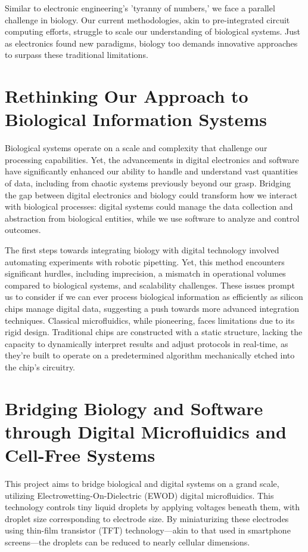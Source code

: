 \documentclass[conference]{IEEEtran}
\begin{document}
Similar to electronic engineering's 'tyranny of numbers,' we face a parallel challenge in biology. Our current methodologies, akin to pre-integrated circuit computing efforts, struggle to scale our understanding of biological systems. Just as electronics found new paradigms, biology too demands innovative approaches to surpass these traditional limitations.

\section{Rethinking Our Approach to Biological Information Systems}

Biological systems operate on a scale and complexity that challenge our processing capabilities. Yet, the advancements in digital electronics and software have significantly enhanced our ability to handle and understand vast quantities of data, including from chaotic systems previously beyond our grasp. Bridging the gap between digital electronics and biology could transform how we interact with biological processes: digital systems could manage the data collection and abstraction from biological entities, while we use software to analyze and control outcomes.

The first steps towards integrating biology with digital technology involved automating experiments with robotic pipetting. Yet, this method encounters significant hurdles, including imprecision, a mismatch in operational volumes compared to biological systems, and scalability challenges. These issues prompt us to consider if we can ever process biological information as efficiently as silicon chips manage digital data, suggesting a push towards more advanced integration techniques. Classical microfluidics, while pioneering, faces limitations due to its rigid design. Traditional chips are constructed with a static structure, lacking the capacity to dynamically interpret results and adjust protocols in real-time, as they're built to operate on a predetermined algorithm mechanically etched into the chip's circuitry.

\section{Bridging Biology and Software through Digital Microfluidics and Cell-Free Systems}

This project aims to bridge biological and digital systems on a grand scale, utilizing Electrowetting-On-Dielectric (EWOD) digital microfluidics. This technology controls tiny liquid droplets by applying voltages beneath them, with droplet size corresponding to electrode size. By miniaturizing these electrodes using thin-film transistor (TFT) technology—akin to that used in smartphone screens—the droplets can be reduced to nearly cellular dimensions.
\end{document}
